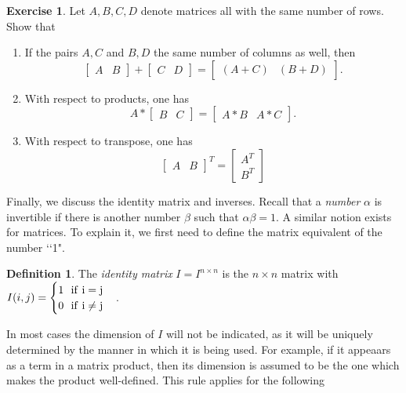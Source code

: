 \documentclass[11pt,notitlepage]{article}
\numberwithin{equation}{section}
\theoremstyle{plain}
\theoremstyle{definition}
\newtheorem{definition}[equation]{Definition}
\newtheorem{exercise}[equation]{Exercise}
\begin{document}
\begin{exercise} Let $A, B, C, D$ denote matrices all with the same number of rows. Show that
\begin{enumerate}
\item If the pairs $A,C$ and $B,D$ the same number of columns as well, then
\[
\begin{bmatrix} A & B\end{bmatrix} + \begin{bmatrix} C & D\end{bmatrix} = \begin{bmatrix} (A+C) & (B+D)\end{bmatrix}.
\]
\item With respect to products, one has
\[
A*\begin{bmatrix} B & C\end{bmatrix} = \begin{bmatrix} A*B & A*C\end{bmatrix}.
\]
\item With respect to transpose, one has
\[
\begin{bmatrix} A & B\end{bmatrix}^T = \begin{bmatrix} A^T \\ B^T\end{bmatrix}
\]
\end{enumerate}
\end{exercise}

Finally, we discuss the identity matrix and inverses. Recall that a {\it number} $\alpha$ is invertible if there is another number $\beta$ such that $\alpha\beta = 1$. A similar notion exists for matrices. To explain it, we first need to define the matrix equivalent of the number \lq\lq 1".

\begin{definition} The {\it identity matrix} $I = I^{n\times n}$ is the $n\times n$ matrix with $I(i,j) = \begin{cases}1\ \ \rm{if}\ i=j\\0\ \ \rm{if}\ i\ne j\end{cases}$.
\end{definition}

In most cases the dimension of $I$ will not be indicated, as it will be uniquely determined by the manner in which it is being used. For example, if it appeaars as a term in a matrix product, then its dimension is assumed to be the one which makes the product well-defined. This rule applies for the following 
\end{document}
